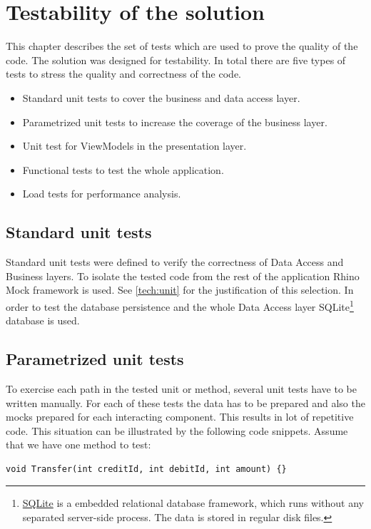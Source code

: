 \chapter{Testability of the solution}
This chapter describes the set of tests which are used to prove the quality of the code. The solution was designed for testability. In total there are five types of tests to stress the quality and correctness of the code.

\begin{itemize}
	\item  Standard unit tests to cover the business and data access layer.
	\item  Parametrized unit tests to increase the coverage of the business layer.
	\item  Unit test for ViewModels in the presentation layer.
	\item  Functional tests to test the whole application.
	\item  Load tests for performance analysis.
\end{itemize}

\section{Standard unit tests}
Standard unit tests were defined to verify the correctness of Data Access and Business layers. To isolate the tested code from the rest of the application Rhino Mock framework is used. See \ref{tech:unit} for the justification of this selection. In order to test the database persistence and the whole Data Access layer SQLite\footnote{\href{http://www.sqlite.org/about.html}{SQLite} is a embedded relational database framework, which runs without any separated server-side process. The data is stored in regular disk files.} database is used.

\section{Parametrized unit tests}
To exercise each path in the tested unit or method, several unit tests have to be written manually. For each of these tests the data has to be prepared and also the mocks prepared for each interacting component. This results in lot of repetitive code. This situation can be illustrated by the following code snippets. Assume that we have one method to test:

\begin{verbatim}
void Transfer(int creditId, int debitId, int amount) {}
\end{verbatim}


